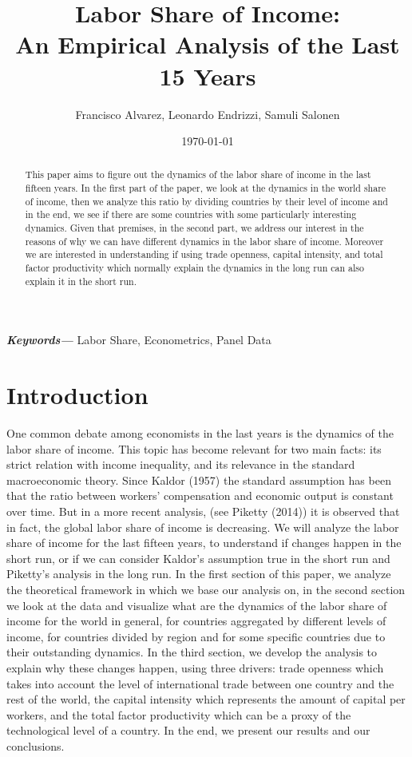 \documentclass[12pt, letterpaper]{article}
\title{\textbf{Labor Share of Income:\\ An Empirical Analysis of the Last 15 Years}}
\author{Francisco Alvarez, Leonardo Endrizzi, Samuli Salonen}
\date{\today}
\numberwithin{table}{section}   %
\begin{document}
\maketitle
\begin{abstract}
	This paper aims to figure out the dynamics of the labor share of income in the last fifteen years. In the first part of the paper, we look at the dynamics in the world share of income, then we analyze this ratio by dividing countries by their level of income and in the end, we see if there are some countries with some particularly interesting dynamics. Given that premises, in the second part, we address our interest in the reasons of why we can have different dynamics in the labor share of income. Moreover we are interested in understanding if using trade openness, capital intensity, and total factor productivity which normally explain the dynamics in the long run can also explain it in the short run.
\end{abstract}
\providecommand{\keywords}[1]
{
  \small	
  \textbf{\textit{Keywords---}} #1
}
\keywords{Labor Share, Econometrics, Panel Data}

\section{Introduction}\label{sec_1}
One common debate among economists in the last years is the dynamics of the labor share of income. This topic has become relevant for two main facts: its strict relation with income inequality, and its relevance in the standard macroeconomic theory. Since Kaldor (1957) the standard assumption has been that the ratio between workers' compensation and economic output is constant over time. But in a more recent analysis, (see Piketty (2014)) it is observed that in fact, the global labor share of income is decreasing. We will analyze the labor share of income for the last fifteen years, to understand if changes happen in the short run, or if we can consider Kaldor's assumption true in the short run and Piketty's analysis in the long run. In the first section of this paper, we analyze the theoretical framework in which we base our analysis on, in the second section we look at the data and visualize what are the dynamics of the labor share of income for the world in general, for countries aggregated by different levels of income, for countries divided by region and for some specific countries due to their outstanding dynamics. In the third section, we develop the analysis to explain why these changes happen, using three drivers: trade openness which takes into account the level of international trade between one country and the rest of the world, the capital intensity which represents the amount of capital per workers, and the total factor productivity which can be a proxy of the technological level of a country. In the end, we present our results and our conclusions.
\end{document}
